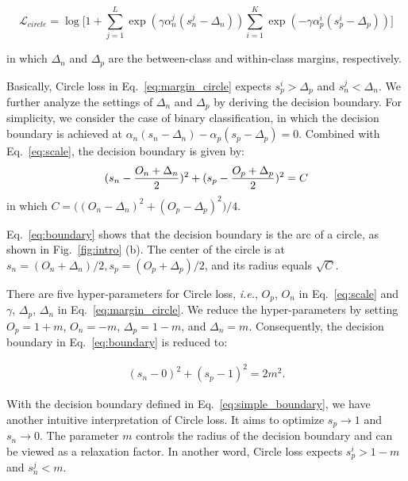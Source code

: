 \documentclass[10pt,twocolumn,letterpaper]{article}
\begin{document}
\begin{scriptsize}
\begin{equation}\label{eq:margin_circle}
\mathcal{L}_{circle}
=\log\big[1+\sum_{j=1}^L\exp(\gamma \alpha_n^j (s_n^j-\Delta_n))\sum_{i=1}^K\exp(-\gamma \alpha_p^i (s_p^i-\Delta_p))\big]
\end{equation} 
\end{scriptsize}
in which $\Delta_n$ and $\Delta_p$ are the between-class and within-class margins, respectively. 

Basically, Circle loss in Eq.~\ref{eq:margin_circle} expects $s_p^i>\Delta_p$ and $s_n^j<\Delta_n$. We further analyze the settings of $\Delta_n$ and $\Delta_p$ by deriving the decision boundary. For simplicity, we consider the case of binary classification, in which the decision boundary is achieved at $\alpha_n (s_n-\Delta_n)-\alpha_p (s_p- \Delta_p)=0$. 
Combined with Eq.~\ref{eq:scale}, the decision boundary is given by:
\begin{equation}\label{eq:boundary}
\footnotesize
    (s_n-\frac{O_n+\Delta_n}{2})^2 + (s_p-\frac{O_p+\Delta_p}{2})^2=C
\end{equation}
in which $C=\big((O_n-\Delta_n)^2+(O_p-\Delta_p)^2\big)/4$.

Eq.~\ref{eq:boundary} shows that the decision boundary is the arc of a circle, as shown in Fig.~\ref{fig:intro} (b). The center of the circle is at $s_n=(O_n+\Delta_n)/2, s_p=(O_p+\Delta_p)/2$, and its radius equals $\sqrt{C}$. %


There are five hyper-parameters for Circle loss, \emph{i.e.}, $O_p$, $O_n$ in Eq.~\ref{eq:scale} and $\gamma$, $\Delta_p$, $\Delta_n$ in Eq.~\ref{eq:margin_circle}. We reduce the hyper-parameters by setting $O_p=1+m$, $O_n=-m$, $\Delta_p=1-m$, and $\Delta_n=m$. 
Consequently, the decision boundary in Eq.~\ref{eq:boundary} is reduced to:

\begin{equation}\label{eq:simple_boundary}
    \begin{aligned}
    (s_n-0)^2 + (s_p-1)^2=2m^2.
    \end{aligned}
\end{equation}

With the decision boundary defined in Eq.~\ref{eq:simple_boundary}, we have another intuitive interpretation of Circle loss. It aims to optimize $s_p\rightarrow1$ and $s_n \rightarrow0$. The parameter $m$ controls the radius of the decision boundary and can be viewed as a relaxation factor. In another word, Circle loss expects $s_p^i>1-m$ and $s_n^j<m$.
\end{document}
